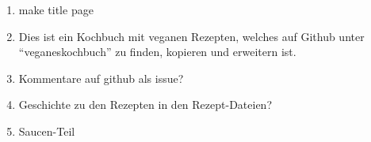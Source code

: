 \documentclass[12pt,a4paper]{article}
\begin{document}
\begin{enumerate}
	\item make title page
	\item Dies ist ein Kochbuch mit veganen Rezepten, welches auf Github unter \enquote{veganeskochbuch} zu finden, kopieren und erweitern ist.\\
	\item Kommentare auf github als issue?
	\item Geschichte zu den Rezepten in den Rezept-Dateien?
	\item Saucen-Teil
\end{enumerate}
\clearpage
	
	
	
%	
\end{document}
